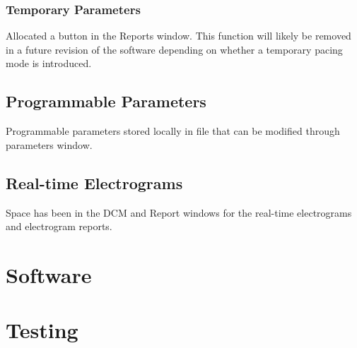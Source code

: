 \documentclass[12pt]{article}
\begin{document}
\subsubsection{Temporary Parameters}
Allocated a button in the Reports window. This function will likely be removed in a future revision of the software depending on whether a temporary pacing mode is introduced.

\subsection{Programmable Parameters}
Programmable parameters stored locally in file that can be modified through parameters window. 

\subsection{Real-time Electrograms}
Space has been in the DCM and Report windows for the real-time electrograms and electrogram reports.

\newpage
\section{Software}
\subsection{}

\newpage
\section{Testing}
\subsection{}
\end{document}
